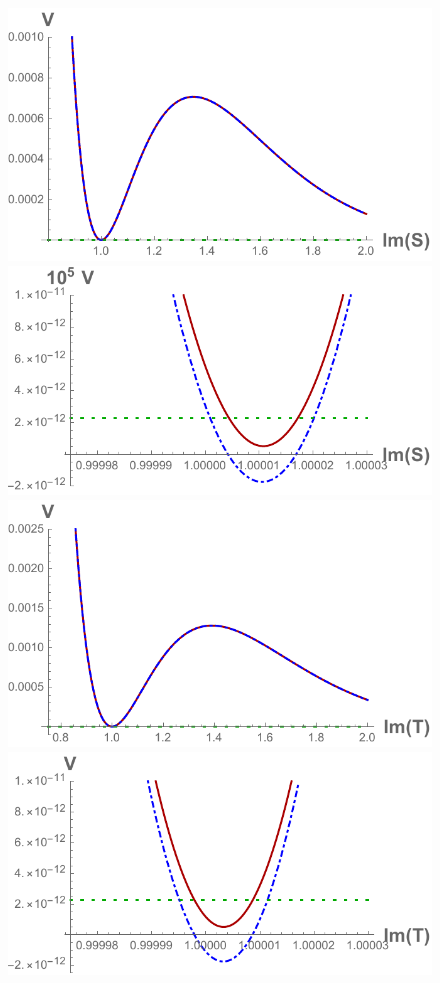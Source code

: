 \documentclass[12pt]{report}
\begin{document}
\begin{figure}[htb]
\center
\includegraphics[scale=0.56]{quevedo_38_S_large.pdf}\qquad\includegraphics[scale=0.6]{quevedo_38_S_close.pdf}
\includegraphics[scale=0.56]{quevedo_38_T_large.pdf}\qquad\includegraphics[scale=0.6]{quevedo_38_T_close.pdf}
\end{figure}
\end{document}
